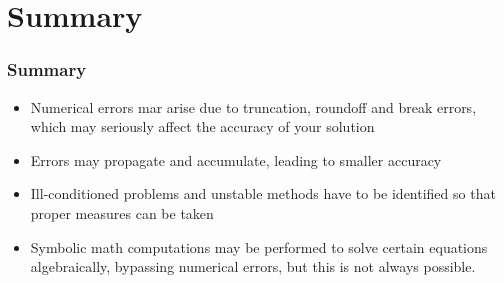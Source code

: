 \documentclass[11pt,table,final,fleqn,xcolor={usenames,dvipsnames}]{beamer}
\begin{document}
 
\section{Summary}
\begin{frame}
  \frametitle{Summary}
  \begin{itemize}
     \item Numerical errors mar arise due to truncation, roundoff and break errors, which may seriously affect the accuracy of your solution
     \item Errors may propagate and accumulate, leading to smaller accuracy
     \item Ill-conditioned problems and unstable methods have to be identified so that proper measures can be taken
     \item Symbolic math computations may be performed to solve certain equations algebraically, bypassing numerical errors, but this is not always possible.
  \end{itemize}

\end{frame}
\end{document}
